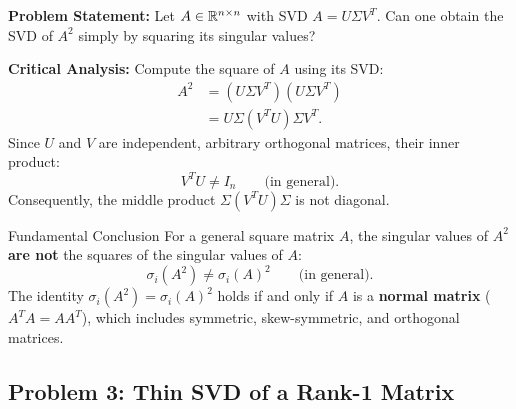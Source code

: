 \begin{example}
\textbf{Problem Statement:} Let $A \in \mathbb{R}^{n \times n}$ with SVD $A = U \Sigma V^T$. Can one obtain the SVD of $A^2$ simply by squaring its singular values?

\medskip
\textbf{Critical Analysis:}
Compute the square of $A$ using its SVD:
\begin{align}
    A^2 &= (U \Sigma V^T)(U \Sigma V^T) \nonumber \\
        &= U \Sigma (V^T U) \Sigma V^T.
\end{align}
Since $U$ and $V$ are independent, arbitrary orthogonal matrices, their inner product:
\begin{equation}
    V^T U \neq I_n \qquad \text{(in general)}.
\end{equation}
Consequently, the middle product $\Sigma (V^T U) \Sigma$ is not diagonal.

\begin{alertblock}{Fundamental Conclusion}
For a general square matrix $A$, the singular values of $A^2$ \textbf{are not} the squares of the singular values of $A$:
\begin{equation}
    \sigma_i(A^2) \neq \sigma_i(A)^2 \qquad \text{(in general)}.
\end{equation}
The identity $\sigma_i(A^2) = \sigma_i(A)^2$ holds if and only if $A$ is a \textbf{normal matrix} ($A^T A = A A^T$), which includes symmetric, skew-symmetric, and orthogonal matrices.
\end{alertblock}
\end{example}

\subsection{Problem 3: Thin SVD of a Rank-1 Matrix}


